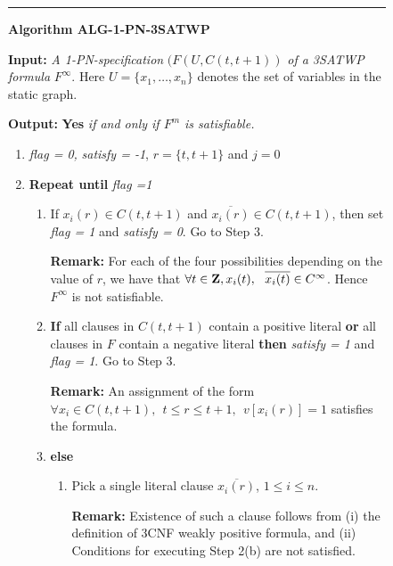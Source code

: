 \smallspacing
{\small
\begin{figure}[tbp]
\rule{16.4cm}{0.01in}

\noindent
{\bf Algorithm ALG-1-PN-3SATWP} 

\noindent
{\bf Input:} {\it A 1-PN-specification} $(F(U,C(t, t+1))$
{\it of a 3SATWP formula } $F^{\infty}$.  Here $U = \{ x_1, \ldots, x_n \}$
denotes the set of variables in the static graph.

\noindent
{\bf Output:} {\bf Yes} {\it if and only if $F^m$  is satisfiable.} 

\begin{enumerate}

\item
{\em flag = 0,} {\em satisfy = -1}, $r = \{ t, t+1 \}$ and $ j = 0$
\item
{\bf Repeat until} {\em flag =1 }

\begin{enumerate}

\item
If $x_i(r) \in C(t, t+1)$  and $\overline{x_i(r)} \in C(t, t+1)$, 
then set {\em flag = 1} and {\em satisfy = 0}. Go to Step 3.

\noindent
{\bf Remark:} 
For each of the four possibilities depending on the value of $r$, we have
that $\forall t \in {\bf Z}, x_i(t), ~~ \overline{x_i(t)} \in C^{\infty}$.
Hence $F^{\infty}$ is not satisfiable.



\item
{\bf If} all clauses in $C(t,t+1)$ contain a positive literal {\bf or}
all clauses in $F$ contain a negative literal {\bf then} {\em satisfy = 1}
and {\em flag = 1}. Go to Step 3.

\noindent
{\bf Remark:} 
An assignment of the form 
$\forall x_i \in C(t, t+1), ~~ t \leq r \leq t+1, ~~   v[x_i(r)] = 1$ 
satisfies the formula.

\item 
{\bf else}

\begin{enumerate}



\item
Pick a single literal clause $\overline{x_i(r)}$, $1 \leq i \leq n$.


\noindent
{\bf Remark:} Existence of such a clause follows from 
(i) the definition of 3CNF weakly positive formula, and 
(ii) Conditions for executing Step 2(b) are not satisfied.




\end{enumerate}
\end{enumerate}
\end{enumerate}
\end{figure}}

